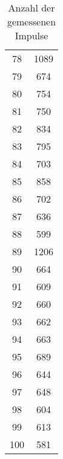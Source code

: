 \begin{table}[!h]
\begin{tabular}{|c|c|}
		\num{78} & \num{1089}\\
		\num{79} & \num{674}\\
		\num{80} & \num{754}\\
		\num{81} & \num{750}\\
		\num{82} & \num{834}\\
		\num{83} & \num{795}\\
		\num{84} & \num{703}\\
		\num{85} & \num{858}\\
		\num{86} & \num{702}\\
		\num{87} & \num{636}\\
		\num{88} & \num{599}\\
		\num{89} & \num{1206}\\
		\num{90} & \num{664}\\
		\num{91} & \num{609}\\
		\num{92} & \num{660}\\
		\num{93} & \num{662}\\
		\num{94} & \num{663}\\
		\num{95} & \num{689}\\
		\num{96} & \num{644}\\
		\num{97} & \num{648}\\
		\num{98} & \num{604}\\
		\num{99} & \num{613}\\
		\num{100} & \num{581}\\
		\hline
	\end{tabular}
	\caption{Anzahl der gemessenen Impulse \label{tab:Messwerte_III}}
\end{table}
